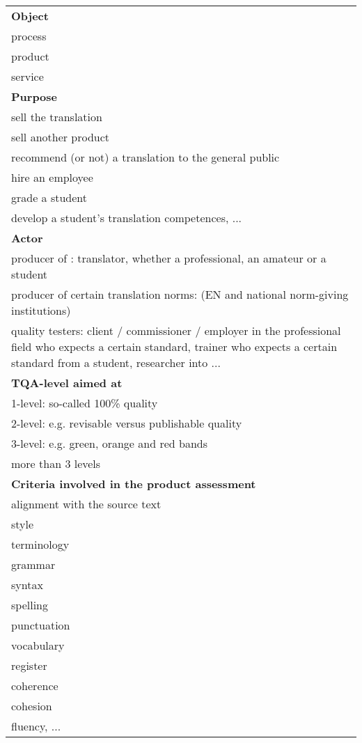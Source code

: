 \documentclass[output=paper]{langsci/langscibook}
\begin{document}
\begin{table}
\footnotesize
\begin{tabularx}{\textwidth}{Q}
\lsptoprule
{\textbf{Object} }\\
 process  \\
 product  \\
 service  \\
 
 \tablevspace 
{\textbf{Purpose} }\\
 sell the translation  \\
 sell another product  \\
 recommend (or not) a translation to the general public  \\
 hire an employee  \\
 grade a student  \\
 develop a student's translation competences, ...  \\
 
 
 \tablevspace 
{\textbf{Actor} }\\
 producer of : translator, whether a professional, an amateur or a student  \\
 producer of certain translation norms:  (EN and national norm-giving institutions)  \\
 quality testers: client / commissioner / employer in the professional field who expects a certain standard, trainer who expects a certain standard from a student, researcher into ...  \\
 
 
 \tablevspace 
{\textbf{TQA-level aimed at} }\\
 {1-level: so-called 100\% quality}\\
 {2-level: e.g. revisable versus publishable quality}\\
 {3-level: e.g. green, orange and red bands}\\
 {more than 3 levels}\\
 
 
 \tablevspace 
{\textbf{Criteria involved in the product assessment}}\\
 {alignment with the source text}\\
 {style}\\
 {terminology}\\
 grammar  \\
 syntax  \\
 spelling  \\
 punctuation  \\
 vocabulary  \\
 register  \\
 coherence  \\
 cohesion  \\
 fluency, ...  \\
 

\end{tabularx}
\end{table}
\end{document}
